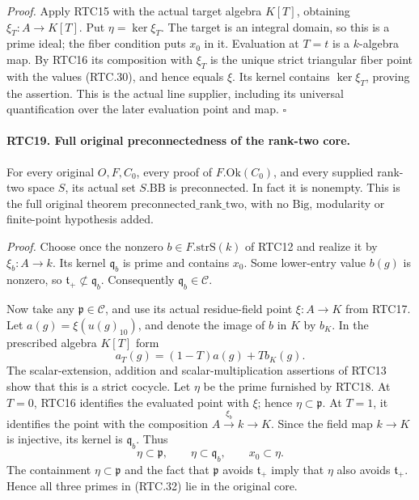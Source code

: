\emph{Proof.}
Apply RTC15 with the actual target algebra \(K[T]\), obtaining
\(\xi_T:A\to K[T]\).  Put \(\eta=\ker\xi_T\).
The target is an integral domain, so this is a prime ideal;
the fiber condition puts \(x_0\) in it.  Evaluation at
\(T=t\) is a \(k\)-algebra map.  By RTC16 its composition
with \(\xi_T\) is the unique strict triangular fiber point
with the values (RTC.30), and hence equals \(\xi\).
Its kernel contains \(\ker\xi_T\), proving the assertion.
This is the actual \(\mathrm{line}\) supplier, including its
universal quantification over the later evaluation point and map.
\hfill\(\square\)

\paragraph{RTC19. Full original preconnectedness of the rank-two core.}
\label{claim:RTC19}
For every original \(O,F,C_0\), every proof of
\(F.\mathrm{Ok}(C_0)\), and every supplied rank-two space
\(S\), its actual set \(S.\mathrm{BB}\) is preconnected.
In fact it is nonempty.  This is the full original theorem
\(\mathrm{preconnected\_rank\_two}\), with no
\(\mathrm{Big}\), modularity or finite-point hypothesis added.

\emph{Proof.}
Choose once the nonzero \(b\in F.\mathrm{strS}(k)\) of
RTC12 and realize it by \(\xi_b:A\to k\).  Its kernel
\(\mathfrak q_b\) is prime and contains \(x_0\).
Some lower-entry value \(b(g)\) is nonzero, so
\(\mathfrak t_+\not\subset\mathfrak q_b\).
Consequently \(\mathfrak q_b\in\mathcal C\).

Now take any \(\mathfrak p\in\mathcal C\), and use its
actual residue-field point \(\xi:A\to K\) from RTC17.
Let \(a(g)=\xi(u(g)_{10})\), and denote the image of \(b\)
in \(K\) by \(b_K\).  In the prescribed algebra \(K[T]\)
form
\[
 a_T(g)=(1-T)a(g)+Tb_K(g).
                                                        \tag{RTC.31}
\]
The scalar-extension, addition and scalar-multiplication assertions
of RTC13 show that this is a strict cocycle.  Let \(\eta\)
be the prime furnished by RTC18.  At \(T=0\), RTC16 identifies
the evaluated point with \(\xi\); hence
\(\eta\subset\mathfrak p\).  At \(T=1\), it identifies
the point with the composition \(A\xrightarrow{\xi_b}k\to K\).
Since the field map \(k\to K\) is injective, its kernel is
\(\mathfrak q_b\).  Thus
\[
 \eta\subset\mathfrak p,\qquad
 \eta\subset\mathfrak q_b,
 \qquad x_0\subset\eta.
                                                        \tag{RTC.32}
\]
The containment \(\eta\subset\mathfrak p\) and the fact
that \(\mathfrak p\) avoids \(\mathfrak t_+\) imply that
\(\eta\) also avoids \(\mathfrak t_+\).  Hence all three
primes in (RTC.32) lie in the original core.

